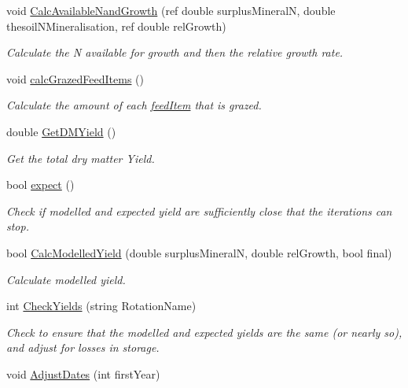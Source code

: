 \begin{DoxyCompactItemize}
void \mbox{\hyperlink{class_crop_class_a93cd3a43b010bf87d8719cc1e45b9dd2}{Calc\+Available\+Nand\+Growth}} (ref double surplus\+MineralN, double thesoil\+N\+Mineralisation, ref double rel\+Growth)
\begin{DoxyCompactList}\small\item\em Calculate the N available for growth and then the relative growth rate. \end{DoxyCompactList}\item 
void \mbox{\hyperlink{class_crop_class_a5f689b2dad39470858a9c30c179f9f86}{calc\+Grazed\+Feed\+Items}} ()
\begin{DoxyCompactList}\small\item\em Calculate the amount of each \mbox{\hyperlink{classfeed_item}{feed\+Item}} that is grazed. \end{DoxyCompactList}\item 
double \mbox{\hyperlink{class_crop_class_a0daa0a0fed32eadc489bded6932a3d95}{Get\+D\+M\+Yield}} ()
\begin{DoxyCompactList}\small\item\em Get the total dry matter Yield. \end{DoxyCompactList}\item 
bool \mbox{\hyperlink{class_crop_class_a66d5088950904f3c70f57202f27ceead}{expect}} ()
\begin{DoxyCompactList}\small\item\em Check if modelled and expected yield are sufficiently close that the iterations can stop. \end{DoxyCompactList}\item 
bool \mbox{\hyperlink{class_crop_class_a583fd6d85ee5f428aebe026f8c5ae3bf}{Calc\+Modelled\+Yield}} (double surplus\+MineralN, double rel\+Growth, bool final)
\begin{DoxyCompactList}\small\item\em Calculate modelled yield. \end{DoxyCompactList}\item 
int \mbox{\hyperlink{class_crop_class_aa028ed077f192692e18046792688e625}{Check\+Yields}} (string Rotation\+Name)
\begin{DoxyCompactList}\small\item\em Check to ensure that the modelled and expected yields are the same (or nearly so), and adjust for losses in storage. \end{DoxyCompactList}\item 
void \mbox{\hyperlink{class_crop_class_a78b34023e52dca49077073e7191727b1}{Adjust\+Dates}} (int first\+Year)

\end{DoxyCompactItemize}
